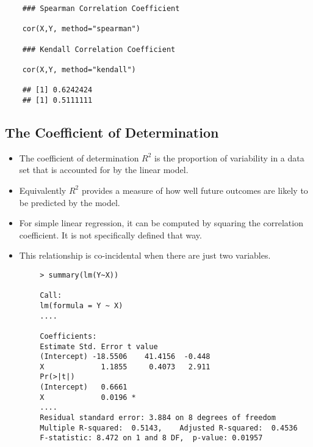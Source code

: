 \documentclass[]{report}
\begin{document}
\begin{framed}
	\begin{verbatim}
	### Spearman Correlation Coefficient
	
	cor(X,Y, method="spearman")
	
	### Kendall Correlation Coefficient
	
	cor(X,Y, method="kendall")
	
	## [1] 0.6242424
	## [1] 0.5111111
	\end{verbatim}
\end{framed}

\subsection*{The Coefficient of Determination}
\begin{itemize}
	\item The coefficient of determination $R^2$ is the proportion of variability in a data set that is accounted for by the linear model. 
	\item Equivalently $R^2$ provides a measure of how well future outcomes are likely to be predicted by the model.
	
	\item For simple linear regression, it can be computed by squaring the correlation coefficient. It is not specifically defined that way. 
	\item This relationship is co-incidental when there are just two variables.
\end{itemize}
{
	
	\begin{framed}
		\begin{verbatim}
		> summary(lm(Y~X))
		
		Call:
		lm(formula = Y ~ X)
		....
		
		Coefficients:
		Estimate Std. Error t value
		(Intercept) -18.5506    41.4156  -0.448
		X             1.1855     0.4073   2.911
		Pr(>|t|)  
		(Intercept)   0.6661  
		X             0.0196 *
		....
		Residual standard error: 3.884 on 8 degrees of freedom
		Multiple R-squared:  0.5143,    Adjusted R-squared:  0.4536 
		F-statistic: 8.472 on 1 and 8 DF,  p-value: 0.01957
		
		\end{verbatim}
	\end{framed}
}




\end{document}
